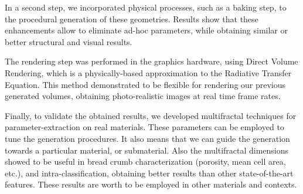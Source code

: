 \documentclass[spanish,a4paper,oneside,10pt,openright]{book}
\begin{document}
In a second step, we incorporated physical processes, such as a baking step, to the procedural generation of these geometries.
Results show that these enhancements allow to eliminate ad-hoc parameters, while obtaining similar or better structural and visual results.

The rendering step was performed in the graphics hardware, using Direct Volume Rendering, which is a physically-based approximation to the Radiative Transfer Equation.
This method demonstrated to be flexible for rendering our previous generated volumes, obtaining photo-realistic images at real time frame rates.

Finally, to validate the obtained results, we developed multifractal techniques for parameter-extraction on real materials.
These parameters can be employed to tune the generation procedures.
It also means that we can guide the generation towards a particular material, or submaterial.
Also the multifractal dimensions showed to be useful in bread crumb characterization (porosity, mean cell area, etc.), and intra-classification, obtaining better results than other state-of-the-art features.
These results are worth to be employed in other materials and contexts.

\phantom{p. 1}
\clearpage
\thispagestyle{empty}

\renewcommand*\glspostdescription{\dotfill}
\setlength{\glslistdottedwidth}{1\textwidth}
\setlength{\glsdescwidth}{0.89\textwidth}
\printglossary[type=\acronymtype,style=long3col, title=Acrónimos]

\phantom{p. 1}
\clearpage

\tableofcontents %

\phantom{p. 1}
\clearpage
\thispagestyle{empty}
\phantom{p. 2}
\clearpage

\cleardoublepage
{} %
\listoffigures %

\phantom{p. 1}
\clearpage
\thispagestyle{empty}
\phantom{p. 1}
\clearpage


\cleardoublepage
{} %
\listoftables %



\newpage


\phantom{p. 1}
\clearpage

 \cleardoublepage
\end{document}
